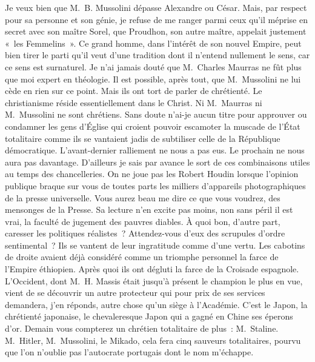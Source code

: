 \documentclass[french,twoside]{book} %
\begin{document}
Je veux bien que M. B. Mussolini dépasse Alexandre ou César. Mais, par respect pour sa personne et son génie, je refuse de me ranger parmi ceux qu’il méprise en secret avec son maître Sorel, que Proudhon, son autre maître, appelait justement « les Femmelins ». Ce grand homme, dans l’intérêt de son nouvel Empire, peut bien tirer le parti qu’il veut d’une tradition dont il n’entend nullement le sens, car ce sens est surnaturel. Je n’ai jamais douté que M. Charles Maurras ne fût plus que moi expert en théologie. Il est possible, après tout, que M. Mussolini ne lui cède en rien sur ce point. Mais ils ont tort de parler de chrétienté. Le christianisme réside essentiellement dans le Christ. Ni M. Maurras ni M. Mussolini ne sont chrétiens. Sans doute n’ai-je aucun titre pour approuver ou condamner les gens d’Église qui croient pouvoir escamoter la muscade de l’État totalitaire comme ils se vantaient jadis de subtiliser celle de la République démocratique. L’avant-dernier ralliement ne nous a pas eus. Le prochain ne nous aura pas davantage. D’ailleurs je sais par avance le sort de ces combinaisons utiles au temps des chancelleries. On ne joue pas les Robert Houdin lorsque l’opinion publique braque sur vous de toutes parts les milliers d’appareils photographiques de la presse universelle. Vous aurez beau me dire ce que vous voudrez, des mensonges de la Presse. Sa lecture n’en excite pas moins, non sans péril il est vrai, la faculté de jugement des pauvres diables. À quoi bon, d’autre part, caresser les politiques réalistes ? Attendez-vous d’eux des scrupules d’ordre sentimental ? Ils se vantent de leur ingratitude comme d’une vertu. Les cabotins de droite avaient déjà considéré comme un triomphe personnel la farce de l’Empire éthiopien. Après quoi ils ont dégluti la farce de la Croisade espagnole. L’Occident, dont M. H. Massis était jusqu’à présent le champion le plus en vue, vient de se découvrir un autre protecteur qui pour prix de ses services demandera, j’en réponds, autre chose qu’un siège à l’Académie. C’est le Japon, la chrétienté japonaise, le chevaleresque Japon qui a gagné en Chine ses éperons d’or. Demain vous compterez un chrétien totalitaire de plus : M. Staline. M. Hitler, M. Mussolini, le Mikado, cela fera cinq sauveurs totalitaires, pourvu que l’on n’oublie pas l’autocrate portugais dont le nom m’échappe.\par
\end{document}
